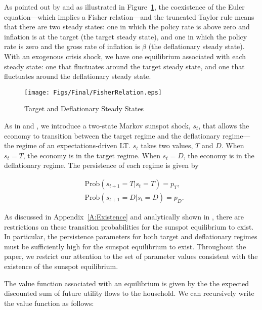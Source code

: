 \documentclass[11pt]{article}
\begin{document}
	As pointed out by \citet{BenhabibSchmittGroheUribe2002} and as illustrated in Figure~\ref{fig:FisherTaylor}, the coexistence of the Euler equation---which implies a Fisher relation---and the truncated Taylor rule means that there are two steady states: one in which the policy rate is above zero and inflation is at the target (the target steady state), and one in which the policy rate is zero and the gross rate of inflation is $\beta$ (the deflationary steady state). With an exogenous crisis shock, we have one equilibrium associated with each steady state: one that fluctuates around the target steady state, and one that fluctuates around the deflationary steady state. 
	
	\begin{figure}[!h]
		\begin{center}
			\caption{Target and Deflationary Steady States\label{fig:FisherTaylor}}
			\texttt{[image: Figs/Final/FisherRelation.eps]}\\
		\end{center}
	\end{figure}
	
	As in \citet{MertensRavn2014} and \citet{AruobaCubaBordaSchorfheide2018}, we introduce a two-state Markov sunspot shock, $s_{t}$, that allows the economy to transition between the target regime and the deflationary regime---the regime of an expectations-driven LT. $s_{t}$ takes two values, $T$ and $D$. When $s_{t}=T$, the economy is in the target regime. When $s_{t}=D$, the economy is in the deflationary regime. The persistence of each regime is given by
	
	\begin{align}
		& \text{Prob}(s_{t+1}=T|s_{t}=T)= p_{T},\\
		& \text{Prob}(s_{t+1}=D|s_{t}=D)= p_{D}.
	\end{align}
	
	\noindent As discussed in Appendix~\ref{A:Existence} and analytically shown in \citet{NakataSchmidt2019}, there are restrictions on these transition probabilities for the sunspot equilibrium to exist. In particular, the persistence parameters for both target and deflationary regimes must be sufficiently high for the sunspot equilibrium to exist. Throughout the paper, we restrict our attention to the set of parameter values consistent with the existence of the sunspot equilibrium.  
	
	The value function associated with an equilibrium is given by the the expected discounted sum of future utility flows to the household. We can recursively write the value function as follows:
	
\end{document}
